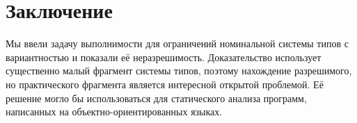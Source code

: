 \section{Заключение}
Мы ввели задачу выполнимости для ограничений номинальной системы типов с вариантностью и показали её неразрешимость. Доказательство использует существенно малый фрагмент системы типов, поэтому нахождение разрешимого, но практического фрагмента является интересной открытой проблемой. Её решение могло бы использоваться для статического анализа программ, написанных на объектно-ориентированных языках.
